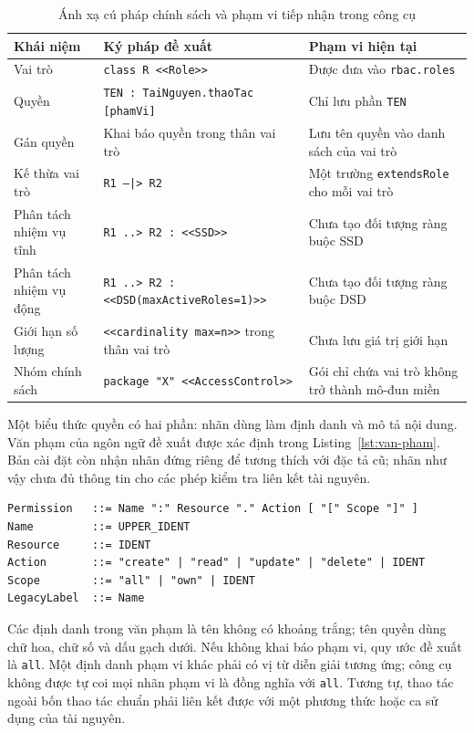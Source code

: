 \begin{table}[htbp]
\centering
\caption{Ánh xạ cú pháp chính sách và phạm vi tiếp nhận trong công cụ}
\label{tab:anh-xa-cu-phap}
\small
\begin{tabularx}{\textwidth}{@{}p{2.5cm}XX@{}}
\toprule
\textbf{Khái niệm} & \textbf{Ký pháp đề xuất} & \textbf{Phạm vi hiện tại} \\
\midrule
Vai trò & \texttt{class R <<Role>>} & Được đưa vào \texttt{rbac.roles} \\
Quyền & \texttt{TEN : TaiNguyen.thaoTac [phamVi]} & Chỉ lưu phần \texttt{TEN} \\
Gán quyền & Khai báo quyền trong thân vai trò & Lưu tên quyền vào danh sách của vai trò \\
Kế thừa vai trò & \texttt{R1 --|> R2} & Một trường \texttt{extendsRole} cho mỗi vai trò \\
Phân tách nhiệm vụ tĩnh & \texttt{R1 ..> R2 : <<SSD>>} & Chưa tạo đối tượng ràng buộc SSD \\
Phân tách nhiệm vụ động & \texttt{R1 ..> R2 : <<DSD(maxActiveRoles=1)>>} & Chưa tạo đối tượng ràng buộc DSD \\
Giới hạn số lượng & \texttt{<<cardinality max=n>>} trong thân vai trò & Chưa lưu giá trị giới hạn \\
Nhóm chính sách & \texttt{package "X" <<AccessControl>>} & Gói chỉ chứa vai trò không trở thành mô-đun miền \\
\bottomrule
\end{tabularx}
\end{table}

Một biểu thức quyền có hai phần: nhãn dùng làm định danh và mô tả nội dung. Văn phạm của ngôn ngữ đề xuất được xác định trong Listing~\ref{lst:van-pham}. Bản cài đặt còn nhận nhãn đứng riêng để tương thích với đặc tả cũ; nhãn như vậy chưa đủ thông tin cho các phép kiểm tra liên kết tài nguyên.

\begin{lstlisting}[caption={Văn phạm đề xuất cho biểu thức quyền},label={lst:van-pham}]
Permission   ::= Name ":" Resource "." Action [ "[" Scope "]" ]
Name         ::= UPPER_IDENT
Resource     ::= IDENT
Action       ::= "create" | "read" | "update" | "delete" | IDENT
Scope        ::= "all" | "own" | IDENT
LegacyLabel  ::= Name
\end{lstlisting}

Các định danh trong văn phạm là tên không có khoảng trắng; tên quyền dùng chữ hoa, chữ số và dấu gạch dưới. Nếu không khai báo phạm vi, quy ước đề xuất là \texttt{all}. Một định danh phạm vi khác phải có vị từ diễn giải tương ứng; công cụ không được tự coi mọi nhãn phạm vi là đồng nghĩa với \texttt{all}. Tương tự, thao tác ngoài bốn thao tác chuẩn phải liên kết được với một phương thức hoặc ca sử dụng của tài nguyên.

